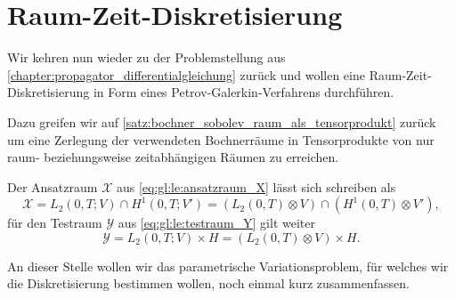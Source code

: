 
\section{Raum-Zeit-Diskretisierung} %
\label{sub:raum_zeit_diskretisierung}

Wir kehren nun wieder zu der Problemstellung aus \cref{chapter:propagator_differentialgleichung} zurück und wollen eine Raum-Zeit-Diskretisierung in Form eines Petrov-Galerkin-Verfahrens durchführen.

Dazu greifen wir auf \cref{satz:bochner_sobolev_raum_als_tensorprodukt} zurück um eine Zerlegung der verwendeten Bochnerräume in Tensorprodukte von nur raum- beziehungsweise zeitabhängigen Räumen zu erreichen.

\begin{Korollar}
    Der Ansatzraum $\mathcal X$ aus \cref{eq:gl:le:ansatzraum_X} lässt sich schreiben als
    \begin{equation}
        \label{eq:gal:ansatzraum_tensor}
        \mathcal X = L_{2}(0, T; V) \cap H^{1}(0, T; V')
            = (L_2(0, T) \otimes V) \cap (H^{1}(0, T) \otimes V'),
    \end{equation}
    für den Testraum $\mathcal Y$ aus \cref{eq:gl:le:testraum_Y} gilt weiter
    \begin{equation}
        \label{eq:gal:testraum_tensor}
        \mathcal Y = L_{2}(0, T; V) \times H = (L_{2}(0, T) \otimes V) \times H.
    \end{equation}
\end{Korollar}

An dieser Stelle wollen wir das parametrische Variationsproblem, für welches wir die Diskretisierung bestimmen wollen, noch einmal kurz zusammenfassen.

\begin{Bemerkung}
\end{Bemerkung}

